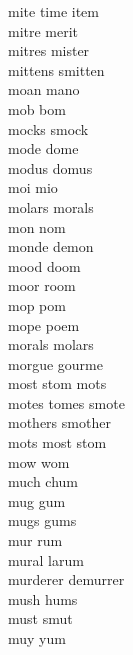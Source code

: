 mite time item\\
mitre merit\\
mitres mister\\
mittens smitten\\
moan mano\\
mob bom\\
mocks smock\\
mode dome\\
modus domus\\
moi mio\\
molars morals\\
mon nom\\
monde demon\\
mood doom\\
moor room\\
mop pom\\
mope poem\\
morals molars\\
morgue gourme\\
most stom mots\\
motes tomes smote\\
mothers smother\\
mots most stom\\
mow wom\\
much chum\\
mug gum\\
mugs gums\\
mur rum\\
mural larum\\
murderer demurrer\\
mush hums\\
must smut\\
muy yum\\

